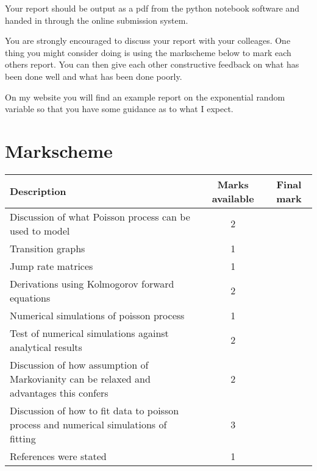 \documentclass[paper=a4, fontsize=11pt]{scrartcl}
\numberwithin{equation}{section}
\numberwithin{figure}{section}
\numberwithin{table}{section}
\begin{document}
Your report should be output as a pdf from the python notebook software and handed in through the online submission system.

You are strongly encouraged to discuss your report with your colleages.  One thing you might consider doing is using the markscheme below to mark each others report.  You can then give each other 
constructive feedback on what has been done well and what has been done poorly.

On my website you will find an example report on the exponential random variable so that you have some guidance as to what I expect.

\section{Markscheme}

\begin{center}
\begin{tabular}{ l | c | c }
Description & Marks available & Final mark \\ \hline
Discussion of what Poisson process can be used to model & 2 & \\
Transition graphs & 1 & \\
Jump rate matrices & 1 & \\
Derivations using Kolmogorov forward equations & 2 & \\
Numerical simulations of poisson process & 1 & \\
Test of numerical simulations against analytical results & 2 & \\
Discussion of how assumption of Markovianity can be relaxed and advantages this confers & 2 & \\
Discussion of how to fit data to poisson process and numerical simulations of fitting & 3 & \\
References were stated & 1 
\end{tabular}
\end{center}
\end{document}
